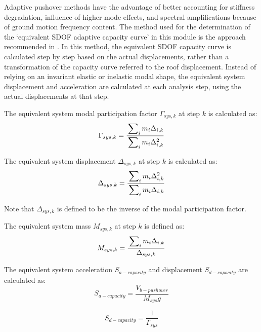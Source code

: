 Adaptive pushover methods have the advantage of better accounting for stiffness degradation, influence of higher mode effects, and spectral amplifications because of ground motion frequency content. The method used for the determination of the ‘equivalent SDOF adaptive capacity curve’ in this module is the approach recommended in \citet{Casarotti2007a}. In this method, the equivalent SDOF capacity curve is calculated step by step based on the actual displacements, rather than a transformation of the capacity curve referred to the roof displacement. Instead of relying on an invariant elastic or inelastic modal shape, the equivalent system displacement and acceleration are calculated at each analysis step, using the actual displacements at that step.

The equivalent system modal participation factor $\Gamma_{sys, k}$ at step $k$ is calculated as:
\begin{equation}
	\Gamma_{sys,k} = \frac{\sideset{}{_i}\sum m_i \Delta_{i,k}}{\sideset{}{_i}\sum m_i \Delta_{i,k}^2}
\end{equation}

The equivalent system displacement $\Delta_{sys,k}$ at step $k$ is calculated as:
\begin{equation}
	\Delta_{sys,k} = \frac{\sideset{}{_i}\sum m_i \Delta_{i,k}^2}{\sideset{}{_i}\sum m_i \Delta_{i,k}}
\end{equation}

Note that $\Delta_{sys,k}$ is defined to be the inverse of the modal participation factor.

The equivalent system mass $M_{sys,k}$ at step $k$ is defined as:
\begin{equation}
	M_{sys,k} = \frac{\sideset{}{_i}\sum m_i \Delta_{i,k}}{\Delta_{sys,k}}
\end{equation}

The equivalent system acceleration $S_{a-capacity}$ and displacement $S_{d-capacity}$ are calculated as:
\begin{equation}
	S_{a-capacity} = \frac{V_{b-pushover}}{M_{sys} g}
\end{equation}

\begin{equation}
	S_{d-capacity} = \frac{1}{\Gamma_{sys}}
\end{equation}